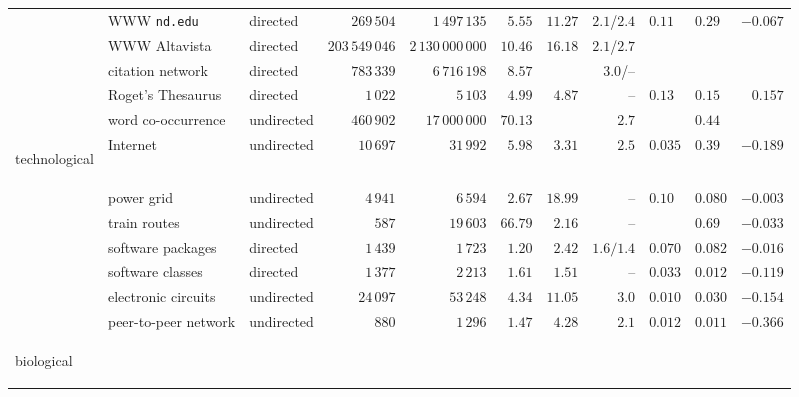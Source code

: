 \begin{table}[!hbt]
{\begin{tabular}{l|l|l|r|r|r|r|r|l|l|r|}
 & WWW \texttt{nd.edu}       & directed   & $269\,504$      & $1\,497\,135$      & $5.55$  & $11.27$ & $2.1$/$2.4$
 & $0.11$  & $0.29$  & $-0.067$  \\
 & WWW Altavista             & directed   & $203\,549\,046$ & $2\,130\,000\,000$ & $10.46$ & $16.18$ & $2.1$/$2.7$
 &         &         &           \\
 & citation network          & directed   & $783\,339$      & $6\,716\,198$      & $8.57$  &         & $3.0$/--
 &         &         &           \\
 & Roget's Thesaurus         & directed   & $1\,022$        & $5\,103$           & $4.99$  & $4.87$  & --
 & $0.13$  & $0.15$  & $0.157$   \\
 & word co-occurrence        & undirected & $460\,902$      & $17\,000\,000$     & $70.13$ &         & $2.7$
 &         & $0.44$  &           \\
\hline
\begin{rotate}{90}
\hbox{\hspace{-6.5em}technological}
\end{rotate}
 & Internet                  & undirected & $10\,697$       & $31\,992$          & $5.98$  & $3.31$  & $2.5$
 & $0.035$ & $0.39$  & $-0.189$  \\
 & power grid                & undirected & $4\,941$        & $6\,594$           & $2.67$  & $18.99$ & --
 & $0.10$  & $0.080$ & $-0.003$  \\
 & train routes              & undirected & $587$           & $19\,603$          & $66.79$ & $2.16$  & --
 &         & $0.69$  & $-0.033$  \\
 & software packages         & directed   & $1\,439$        & $1\,723$           & $1.20$  & $2.42$  & $1.6/1.4$
 & $0.070$ & $0.082$ & $-0.016$  \\
 & software classes          & directed   & $1\,377$        & $2\,213$           & $1.61$  & $1.51$  & --
 & $0.033$ & $0.012$ & $-0.119$  \\
 & electronic circuits       & undirected & $24\,097$       & $53\,248$          & $4.34$  & $11.05$ & $3.0$
 & $0.010$ & $0.030$ & $-0.154$  \\
 & peer-to-peer network      & undirected & $880$           & $1\,296$           & $1.47$  & $4.28$  & $2.1$
 & $0.012$ & $0.011$ & $-0.366$  \\
\hline
\begin{rotate}{90}
\hbox{\hspace{-4.4em}biological}
\end{rotate}

\end{tabular}}
\end{table}
